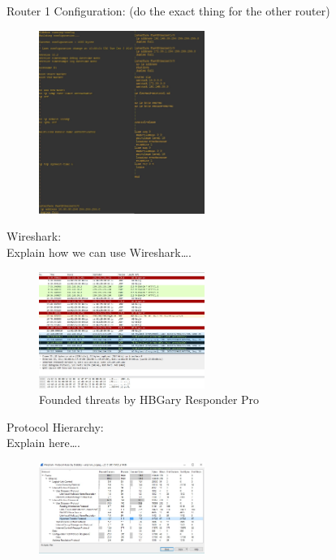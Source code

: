 \documentclass{article}
\begin{document}
Router 1 Configuration: (do the exact thing for the other router)

\begin{figure}[H]
	\begin{center}
		\includegraphics[width=0.48\textwidth]{Routerconfig.jpg}
	\end{center}
	\caption{\small  \newline}
	\label{fig:Prd}
\end{figure}


Wireshark:\\
Explain how we can use Wireshark….

\begin{figure}[H]
	\begin{center}
		\includegraphics[width=0.48\textwidth]{wireshark.jpg}
	\end{center}
	\caption{ Founded threats by HBGary Responder Pro }
	\label{fig:Prd}
\end{figure}

Protocol Hierarchy:\\
Explain here….


\begin{figure}[H]
	\begin{center}
		\includegraphics[width=0.48\textwidth]{Hierarchyst.jpg}
	\end{center}
	\caption{\small  \newline}
	\label{fig:Prd}
\end{figure}



\end{document}
